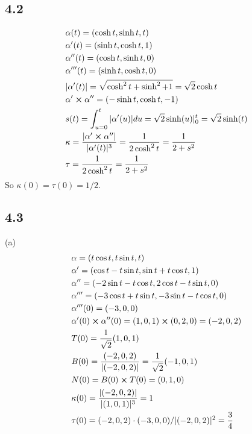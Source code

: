 \documentclass[12pt]{article}
\begin{document}
\subsection*{4.2}
$$\begin{aligned}
	&\alpha(t) = (\cosh t, \sinh t, t) \\
	&\alpha'(t) = (\sinh t, \cosh t, 1) \\
	&\alpha''(t) = (\cosh t, \sinh t, 0) \\
	&\alpha'''(t) = (\sinh t, \cosh t, 0) \\
	&|\alpha'(t)| = \sqrt{\cosh^2 t + \sinh^2 + 1} = \sqrt{2}\cosh t \\
	&\alpha' \cross \alpha'' = (-\sinh t , \cosh t, -1) \\
	& s(t) = \int_{u=0}^t |\alpha'(u)|du = \sqrt{2} \sinh(u) |^{t}_{0} = \sqrt{2}\sinh(t) \\
	&\kappa = \frac{|\alpha' \cross \alpha''|}{|\alpha'(t)|^3} = \frac{1}{2 \cosh^2 t} = \frac{1}{2 + s^2} \\
	&\tau = \frac{1}{2 \cosh^2 t} = \frac{1}{2 + s^2}
\end{aligned}
$$
So $\kappa(0) = \tau(0) = 1/2$.

\subsection*{4.3}
(a) $$
\begin{aligned}
	&\alpha = (t\cos t, t\sin t, t) \\
	&\alpha' = (\cos t - t \sin t, \sin t + t\cos t , 1) \\
	&\alpha'' = (-2\sin t - t\cos t, 2\cos t - t \sin t , 0) \\
	&\alpha''' = (-3\cos t + t\sin t, -3\sin t - t\cos t, 0) \\
	&\alpha'''(0) = (-3, 0, 0) \\
	&\alpha'(0) \cross \alpha''(0) = (1, 0, 1) \cross (0, 2, 0) = (-2, 0, 2) \\
	&T(0) = \frac{1}{\sqrt{2}} (1, 0, 1) \\
	&B(0) = \frac{ (-2, 0, 2)} {| (-2, 0, 2)|} = \frac{1}{\sqrt{2}} (-1, 0, 1) \\
	&N(0) = B(0) \cross T(0) = (0, 1, 0) \\
	&\kappa(0) = \frac{|(-2, 0, 2)|}{|(1, 0, 1)|^3} = 1 \\
	&\tau(0) =  (-2, 0, 2) \cdot (-3 , 0, 0) / | (-2, 0, 2)|^2  = \frac{3}{4}
\end{aligned}
$$
\end{document}
